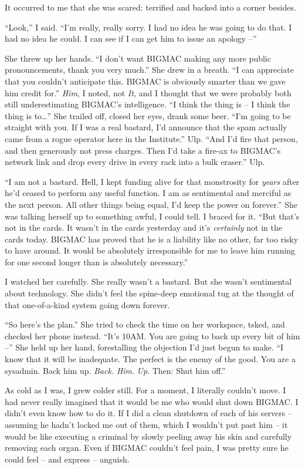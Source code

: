 It occurred to me that she was scared: terrified and backed into a 
corner besides.

“Look,” I said. “I'm really, really sorry. I had no idea he was 
going to do that. I had no idea he could. I can see if I can get him to 
issue an apology --”

She threw up her hands. “I don't want BIGMAC making any more public 
pronouncements, thank you very much.” She drew in a breath. “I can 
appreciate that you couldn't anticipate this. BIGMAC is obviously 
smarter than we gave him credit for.” \emph{Him}, I noted, not 
\emph{It,} and I thought that we were probably both still 
underestimating BIGMAC's intelligence. “I think the thing is -- I 
think the thing is to\ldots{}” She trailed off, closed her eyes, drank 
some beer. “I'm going to be straight with you. If I was a real 
bastard, I'd announce that the spam actually came from a rogue operator 
here in the Institute.” Ulp. “And I'd fire that person, and then 
generously not press charges. Then I'd take a fire-ax to BIGMAC's 
network link and drop every drive in every rack into a bulk eraser.” 
Ulp.

“I am not a bastard. Hell, I kept funding alive for that monstrosity 
for \emph{years} after he'd ceased to perform any useful function. I am 
as sentimental and merciful as the next person. All other things being 
equal, I'd keep the power on forever.” She was talking herself up to 
something awful, I could tell. I braced for it. “But that's not in 
the cards. It wasn't in the cards yesterday and it's \emph{certainly} 
not in the cards today. BIGMAC has proved that he is a liability like 
no other, far too risky to have around. It would be absolutely 
irresponsible for me to leave him running for one second longer than is 
absolutely necessary.”

I watched her carefully. She really wasn't a bastard. But she wasn't 
sentimental about technology. She didn't feel the spine-deep emotional 
tug at the thought of that one-of-a-kind system going down forever.

“So here's the plan.” She tried to check the time on her workspace, 
tsked, and checked her phone instead. “It's 10AM. You are going to 
back up every bit of him --” She held up her hand, forestalling the 
objection I'd just begun to make. “I know that it will be inadequate. 
The perfect is the enemy of the good. You are a sysadmin. Back him up. 
\emph{Back.} \emph{Him}. \emph{Up}. Then: Shut him off.”

As cold as I was, I grew colder still. For a moment, I literally 
couldn't move. I had never really imagined that it would be me who 
would shut down BIGMAC. I didn't even know how to do it. If I did a 
clean shutdown of each of his servers -- assuming he hadn't locked me 
out of them, which I wouldn't put past him -- it would be like 
executing a criminal by slowly peeling away his skin and carefully 
removing each organ. Even if BIGMAC couldn't feel pain, I was pretty 
sure he could feel -- and express -- anguish.

